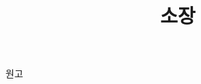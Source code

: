 \documentclass[15pt]{oblivoir} %
\begin{document}
\title{소장}
\maketitle
\begin{minipage}{\textwidth}
원고
  \end{minipage}
\end{document}

